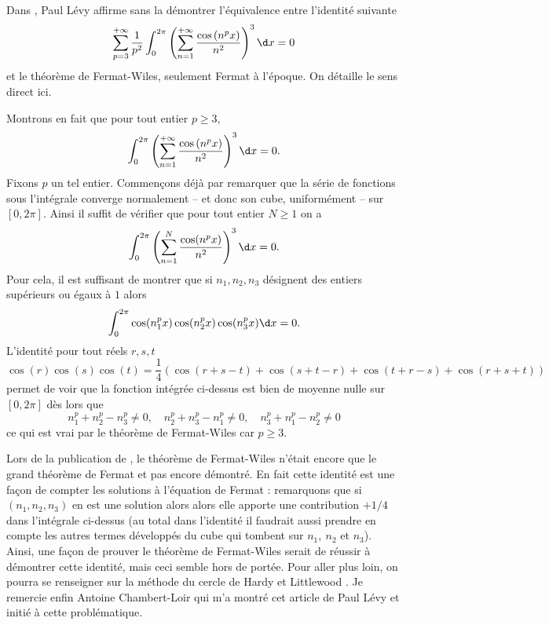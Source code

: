 \documentclass{notes}
\begin{document}

Dans \cite{Levy}, Paul Lévy affirme sans la démontrer l'équivalence entre l'identité suivante
\[ \sum_{p=3}^{+\infty} \frac{1}{p^{2}} \int_{0}^{2\pi} \left( \sum_{n=1}^{+\infty} \frac{\cos\left( n^{p }x \right)}{n^{2}} \right)^{3}  \d x = 0  \]
et le théorème de Fermat-Wiles, seulement Fermat à l'époque. On détaille le sens direct ici.

Montrons en fait que pour tout entier $p\geq 3$, 
\[ \int_{0}^{2\pi} \left( \sum_{n=1}^{+\infty} \frac{\cos\left( n^{p }x \right)}{n^{2}} \right)^{3}  \d x = 0 .  \]
Fixons $p$ un tel entier. Commençons déjà par remarquer que la série de fonctions sous l'intégrale converge normalement -- et donc son cube, uniformément -- sur $[0,2\pi]$. Ainsi il suffit de vérifier que pour tout entier $N\geq 1$ on a 
\[  \int_{0}^{2\pi}   \left( \sum_{n=1}^{N} \frac{\cos(n^{p}x)}{n^{2}} \right)^{3} \d x = 0. \]
Pour cela, il est suffisant de montrer que si $n_1,n_2,n_3$ désignent des entiers supérieurs ou égaux à $1$ alors 
\[ \int_{0}^{2\pi} \cos(n_1^{p} x)\cos(n_2^{p}x) \cos(n_3^{p}x) \d x = 0.\]
L'identité pour tout réels $r,s,t$ 
\[\cos \left( r \right) \cos \left( s \right) \cos \left( t \right) = \frac 14 \left( \cos(r+s-t)+\cos(s+t-r) + \cos(t+r-s) + \cos(r+s+t) \right)\]
permet de voir que la fonction intégrée ci-dessus est bien de moyenne nulle sur $[0,2\pi]$ dès lors que 
\[ n_1^p+n_2^p-n_3^p \neq 0, \quad n_2^p+n_3^p-n_1^p \neq 0,\quad n_3^p+n_1^p-n_2^p \neq 0 \] 
ce qui est vrai par le théorème de Fermat-Wiles car $p \geq 3$.


\begin{rem}
  Lors de la publication de \cite{Levy}, le théorème de Fermat-Wiles n'était encore que le grand théorème de Fermat et pas encore démontré. En fait cette identité est une façon de compter les solutions à l'équation de Fermat : remarquons que si $(n_1,n_2,n_3)$ en est une solution alors alors elle apporte une contribution $+1/4$ dans l'intégrale ci-dessus (au total dans l'identité il faudrait aussi prendre en compte les autres termes développés du cube qui tombent sur $n_1,\ n_2$ et $n_3$).  Ainsi, une façon de prouver le théorème de Fermat-Wiles serait de réussir à démontrer cette identité, mais ceci semble hors de portée. Pour aller plus loin, on pourra se renseigner sur la méthode du cercle de Hardy et Littlewood \cite{HW}.   Je remercie enfin Antoine Chambert-Loir qui m'a montré cet article de Paul Lévy et initié à cette problématique.
\end{rem}





 
\end{document}
